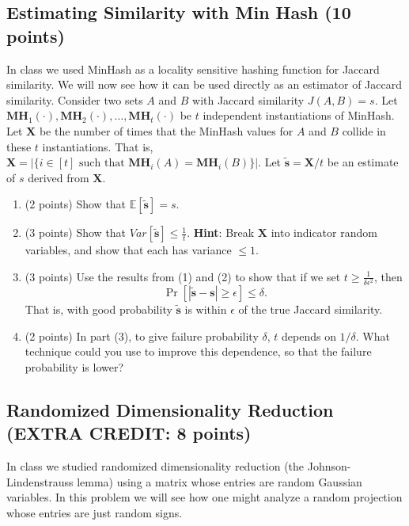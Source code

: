 \documentclass[11pt]{article}
\newcommand{\bv}[1]{\mathbf{#1}}
\newcommand{\E}{\mathbb{E}}
\begin{document}
\subsection*{Estimating Similarity with Min Hash \normalfont (10 points)} 
In class we used MinHash as a locality sensitive hashing function for Jaccard similarity. We will now see how it can be used directly  as an estimator of Jaccard similarity.
Consider two sets $A$ and $B$ with Jaccard similarity $J(A,B) = s$. Let $\bv{MH}_1(\cdot), \bv{MH}_2(\cdot),\ldots, \bv{MH}_t(\cdot)$ be $t$ independent instantiations of MinHash. Let $\bv{X}$ be the number of times that the MinHash values for $A$ and $B$ collide in these $t$ instantiations. That is, $\bv{X} = | \{i \in [t]\text{ such that }\bv{MH}_i(A) = \bv{MH}_i(B)\}|$. Let $\bv{\tilde s} = \bv{X}/t$ be an estimate of $s$ derived from $\bv{X}$.
\begin{enumerate}
\item (2 points) Show that $\E[\bv{\tilde s}] = s$.
\vspace{12em}
\item (3 points) Show that $Var[\bv{\tilde s}] \le \frac{1}{t}$. \textbf{Hint}: Break $\bv{X}$ into indicator random variables, and show that each has variance $\le 1$.
\vspace{18em}
\item (3 points) Use the results from (1) and (2) to show that if we set $t \ge \frac{1}{\delta \epsilon^2}$, then
$$\Pr[|\bv{\tilde s} - \bv{s}| \ge \epsilon] \le \delta.$$  %
That is, with good probability $\bv{\tilde s} $ is within $\epsilon$ of the true Jaccard similarity.
\vspace{18em}
\item (2 points) In part  (3), to give failure probability $\delta$, $t$ depends on $1/\delta$. What technique could you use  to improve this dependence, so that  the failure probability  is lower? 
\vspace{6em}
\end{enumerate}

\clearpage

\subsection*{Randomized Dimensionality Reduction \normalfont (EXTRA CREDIT: 8 points)} 
In class  we studied randomized dimensionality reduction (the Johnson-Lindenstrauss lemma) using a matrix whose entries are random Gaussian variables. In this problem we will see how one might analyze a random projection whose entries are just random signs.
\end{document}
